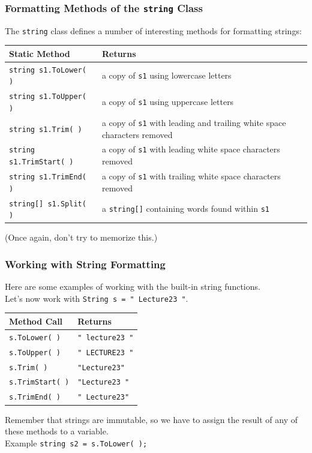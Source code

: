 \begin{frame}
\frametitle{Formatting Methods of the \texttt{string} Class}

The \texttt{string} class defines a number of interesting methods for formatting strings:

\begin{center}
\begin{tabular}{l|p{6cm}}
	\textbf{Static Method} & \textbf{Returns} \\ \hline
	
\texttt{string s1.ToLower( )} & a copy of \texttt{s1} using lowercase letters \\ \hline
\texttt{string s1.ToUpper( )} & a copy of \texttt{s1} using uppercase letters \\ \hline
\texttt{string s1.Trim( )} & a copy of \texttt{s1} with leading and trailing white space characters removed \\ \hline
\texttt{string s1.TrimStart( )} & a copy of \texttt{s1} with leading white space characters removed \\ \hline
\texttt{string s1.TrimEnd( )} & a copy of \texttt{s1} with trailing white space characters removed \\ \hline
\texttt{string[] s1.Split( )} & a \texttt{string[]} containing words found within \texttt{s1} \\
	
\end{tabular}
\end{center}

(Once again, don't try to memorize this.)

\end{frame}

\begin{frame}
\frametitle{Working with String Formatting}
Here are some examples of working with the built-in string functions.\\
\quad Let's now work with \texttt{String s = " Lecture23 "}.

\begin{center}
\begin{tabular}{l|l}
	\textbf{Method Call} & \textbf{Returns} \\ \hline
	\texttt{s.ToLower( )} & \texttt{" lecture23 "}\\
    \texttt{s.ToUpper( )} & \texttt{" LECTURE23 "}\\
    \texttt{s.Trim( )} & \texttt{"Lecture23"}\\
    \texttt{s.TrimStart( )} & \texttt{"Lecture23 "}\\
    \texttt{s.TrimEnd( )} & \texttt{" Lecture23"}
\end{tabular}
\end{center}

Remember that strings are immutable, so we have to assign the result of any of these methods to a variable.\\
\quad Example \texttt{string s2 = s.ToLower( );}

\end{frame}

